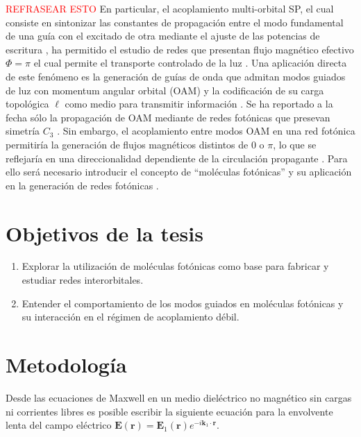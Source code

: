 \documentclass{article}
\begin{document}
	\textcolor{red}{REFRASEAR ESTO} En particular, el acoplamiento multi-orbital SP, el cual consiste en sintonizar las constantes de propagación entre el modo fundamental de una guía con el excitado de otra mediante el ajuste de las potencias de escritura \cite{interorbital}, ha permitido el estudio de redes que presentan flujo magnético efectivo $\Phi = \pi$ el cual permite el transporte controlado de la luz \cite{OAMCaging, ABCaging}. Una aplicación directa de este fenómeno es la generación de guías de onda que admitan modos guiados de luz con momentum angular orbital (OAM) y la codificación de su carga topológica $\ell$ como medio para transmitir información \cite{oamapp, oamfree}. Se ha reportado a la fecha sólo la propagación de OAM mediante de redes fotónicas que presevan simetría $C_3$ \cite{OAMWG, vortex}. Sin embargo, el acoplamiento entre modos OAM en una red fotónica permitiría la generación de flujos magnéticos distintos de $0$ o $\pi$, lo que se reflejaría en una direccionalidad dependiente de la circulación propagante \cite{vortextrim, topoOAM}. Para ello será necesario introducir el concepto de ``moléculas fotónicas'' \cite{molecules} y su aplicación en la generación de redes fotónicas \cite{SPSSH}.
\section{Objetivos de la tesis}
\begin{enumerate}
	\item Explorar la utilización de moléculas fotónicas como base para fabricar y estudiar redes interorbitales.
	\item Entender el comportamiento de los modos guiados en moléculas fotónicas y su interacción en el régimen de acoplamiento débil.
\end{enumerate}
\section{Metodología}

Desde las ecuaciones de Maxwell en un medio dieléctrico no magnético sin cargas ni corrientes libres es posible escribir la siguiente ecuación para la envolvente lenta del campo eléctrico $\textbf{E}(\textbf{r}) = \textbf{E}_1(\textbf{r}) e^{-i \textbf{k}_1 \cdot \textbf{r}}$.
\end{document}
